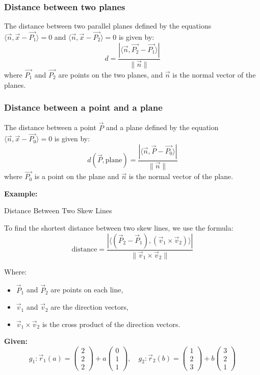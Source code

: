 \subsubsection{Distance between two planes}

The distance between two parallel planes defined by the equations \(\langle \vec{n}, \vec{x} - \vec{P_1} \rangle = 0\) and \(\langle \vec{n}, \vec{x} - \vec{P_2} \rangle = 0\) is given by:
\[
	d = \frac{|\langle \vec{n}, \vec{P_2} - \vec{P_1} \rangle|}{\|\vec{n}\|}
\]
where \(\vec{P_1}\) and \(\vec{P_2}\) are points on the two planes, and \(\vec{n}\) is the normal vector of the planes.

\subsubsection{Distance between a point and a plane}

The distance between a point \(\vec{P}\) and a plane defined by the equation \(\langle \vec{n}, \vec{x} - \vec{P_0} \rangle = 0\) is given by:
\[
	d(\vec{P}, \text{plane}) = \frac{|\langle \vec{n}, \vec{P} - \vec{P_0} \rangle|}{\|\vec{n}\|}
\]
where \(\vec{P_0}\) is a point on the plane and \(\vec{n}\) is the normal vector of the plane.
\vspace{\baselineskip}

\textbf{Example:}
\vspace{\baselineskip}
 

Distance Between Two Skew Lines

To find the shortest distance between two skew lines, we use the formula:
\[
	\text{distance} = \frac{|\langle(\vec{P}_2 - \vec{P}_1), (\vec{v}_1 \times \vec{v}_2)\rangle|}{\|\vec{v}_1 \times \vec{v}_2\|}
\]

Where:
\begin{itemize}[label=\(-\)]
	\item \(\vec{P}_1\) and \(\vec{P}_2\) are points on each line,
	\item \(\vec{v}_1\) and \(\vec{v}_2\) are the direction vectors,
	\item \(\vec{v}_1 \times \vec{v}_2\) is the cross product of the direction vectors.
\end{itemize}

\textbf{Given:}
\[
	g_1: \vec{r}_1(a) = \begin{pmatrix} 2 \\ 2 \\ 2 \end{pmatrix} + a \begin{pmatrix} 0 \\ 1 \\ 1 \end{pmatrix}, \quad
	g_2: \vec{r}_2(b) = \begin{pmatrix} 1 \\ 2 \\ 3 \end{pmatrix} + b \begin{pmatrix} 3 \\ 2 \\ 1 \end{pmatrix}
\]

